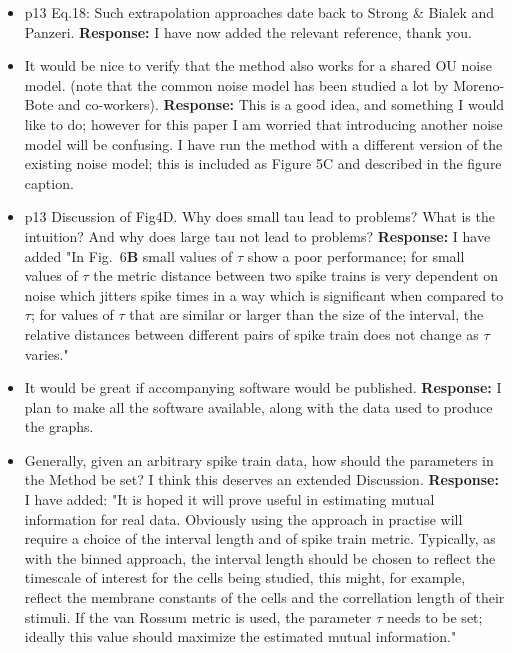 \documentclass[12pt]{article}
\begin{document}
\begin{itemize}

\item p13 Eq.18: Such extrapolation approaches date back to Strong \& Bialek and Panzeri.  \textbf{Response:} I have now added the relevant reference, thank you.

\item It would be nice to verify that the method also works for a shared OU noise model.
(note that the common noise model has been studied a lot by Moreno-Bote and co-workers).  \textbf{Response:} This is a good idea, and something I would like to do; however for
   this paper I am worried that introducing another noise model will
   be confusing. I have run the method with a different version of the
   existing noise model; this is included as Figure 5C and described
   in the figure caption.

\item p13 Discussion of Fig4D. Why does small tau lead to problems? What
  is the intuition? And why does large tau not lead to problems?  \textbf{Response:} I have added "In Fig.~6\textbf{B} small values of
$\tau$ show a poor performance; for small values of $\tau$ the metric
distance between two spike trains is very dependent on noise which
jitters spike times in a way which is significant when compared to
$\tau$; for values of $\tau$ that are similar or larger than the size
of the interval, the relative distances between different pairs of
spike train does not change as $\tau$ varies."

\item It would be great if accompanying software would be published. \textbf{Response:} I plan to make all the software available, along with the data used to produce the graphs.

\item Generally, given an arbitrary spike train data, how should the
  parameters in the Method be set? I think this deserves an extended
  Discussion.  \textbf{Response:} I have added: "It is hoped it will prove useful in estimating
mutual information for real data. Obviously using the approach in
practise will require a choice of the interval length and of spike
train metric. Typically, as with the binned approach, the interval
length should be chosen to reflect the timescale of interest for the
cells being studied, this might, for example, reflect the membrane
constants of the cells and the correllation length of their
stimuli. If the van Rossum metric is used, the parameter $\tau$ needs
to be set; ideally this value should maximize the estimated mutual
information."
\end{itemize}
\end{document}
